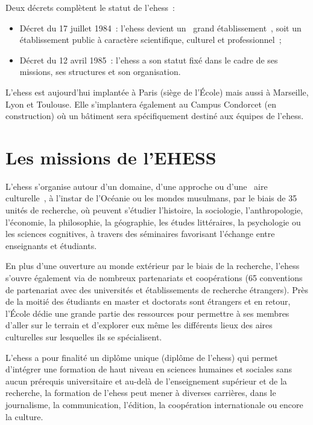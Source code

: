 Deux décrets complètent le statut de l'\acrshort{ehess}~:
    \begin{itemize}
        \item Décret du 17 juillet 1984~: l'\acrshort{ehess} devient un \og~grand établissement~\fg{}, soit un établissement public à caractère scientifique, culturel et professionnel~;
        \item Décret du 12 avril 1985~: l'\acrshort{ehess} a son statut fixé dans le cadre de ses missions, ses structures et son organisation.
    \end{itemize}
L'\acrshort{ehess} est aujourd'hui implantée à Paris (siège de l'École) mais aussi à Marseille, Lyon et Toulouse. Elle s'implantera également au Campus Condorcet (en construction) où un bâtiment sera spécifiquement destiné aux équipes de l'\acrshort{ehess}.

\section{Les missions de l'EHESS}
L'\acrshort{ehess} s'organise autour d'un domaine, d'une approche ou d'une \og~aire culturelle~\fg{}, à l'instar de l'Océanie ou les mondes musulmans, par le biais de 35 unités de recherche, où peuvent s'étudier l'histoire, la sociologie, l'anthropologie, l'économie, la philosophie, la géographie, les études littéraires, la psychologie ou les sciences cognitives, à travers des séminaires favorisant l'échange entre enseignants et étudiants.

En plus d'une ouverture au monde extérieur par le biais de la recherche, l'\acrshort{ehess} s'ouvre également via de nombreux partenariats et coopérations (65 conventions de partenariat avec des universités et établissements de recherche étrangers). Près de la moitié des étudiants en master et doctorats sont étrangers et en retour, l'École dédie une grande partie des ressources pour permettre à ses membres d'aller sur le terrain et d'explorer eux même les différents lieux des aires culturelles sur lesquelles ils se spécialisent.

L'\acrshort{ehess} a pour finalité un diplôme unique (diplôme de l'\acrshort{ehess}) qui permet d'intégrer une formation de haut niveau en sciences humaines et sociales sans aucun prérequis universitaire et au-delà de l'enseignement supérieur et de la recherche, la formation de l'\acrshort{ehess} peut mener à diverses carrières, dans le journalisme, la communication, l'édition, la coopération internationale ou encore la culture.